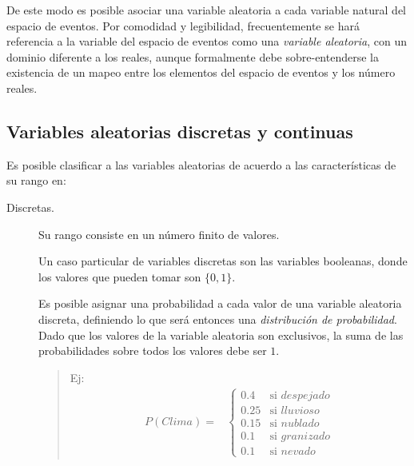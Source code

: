  
De este modo es posible asociar una variable aleatoria a cada variable natural del espacio de eventos.  Por comodidad y legibilidad, frecuentemente se hará referencia a la variable del espacio de eventos como una \textit{variable aleatoria}, con un dominio diferente a los reales, aunque formalmente debe sobre-entenderse la existencia de un mapeo entre los elementos del espacio de eventos y los número reales.

\subsection{Variables aleatorias discretas y continuas}

Es posible clasificar a las variables aleatorias de acuerdo a las características de su rango en:
\begin{description}
 \item [Discretas.] Su rango consiste en un número finito de valores.
 
 Un caso particular de variables discretas son las variables booleanas, donde los valores que pueden tomar son $\{0,1\}$.
 
 Es posible asignar una probabilidad a cada valor de una variable aleatoria discreta, definiendo lo que será entonces una \emph{distribución de probabilidad}.  Dado que los valores de la variable aleatoria son exclusivos, la suma de las probabilidades sobre todos los valores debe ser $1$.

 \begin{quotation}
  Ej:
  \begin{align*}
   P(Clima) =&  \begin{cases}
		0.4	& \text{si } despejado \\
		0.25       & \text{si } lluvioso \\
		0.15	& \text{si } nublado \\
		0.1	& \text{si } granizado \\
		0.1	& \text{si } nevado
	      \end{cases}
  \end{align*}

 \end{quotation}
 

\end{description}
